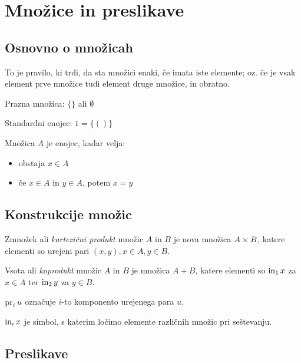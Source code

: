 \section{Množice in preslikave}

\subsection{Osnovno o množicah}


To je pravilo, ki trdi, da sta množici enaki, če imata iste elemente; oz. če je vsak element prve množice tudi element druge množice, in obratno.


Prazna množica: $\{\}$ ali $\emptyset$

Standardni enojec: $1 = \{()\}$


Množica $A$ je enojec, kadar velja:
\begin{itemize}
	\item obstaja $x \in A$
	\item če $x \in A$ in $y \in A$, potem $x = y$
\end{itemize}

\subsection{Konstrukcije množic}


Zmnožek ali \textit{kartezični produkt} množic $A$ in $B$ je nova množica $A \times B$, katere elementi so urejeni pari $(x,y), x \in A, y \in B$.

Vsota ali \textit{koprodukt} množic $A$ in $B$ je množica $A + B$, katere elementi so $\mathrm{in}_1\, x$ za $x \in A$ ter $\mathrm{in}_2\, y$ za $y \in B$.


$\mathrm{pr}_i\, u$ označuje $i$-to komponento urejenega para $u$.

$\mathrm{in}_i\, x$ je simbol, s katerim ločimo elemente različnih množic pri seštevanju.

\subsection{Preslikave}

